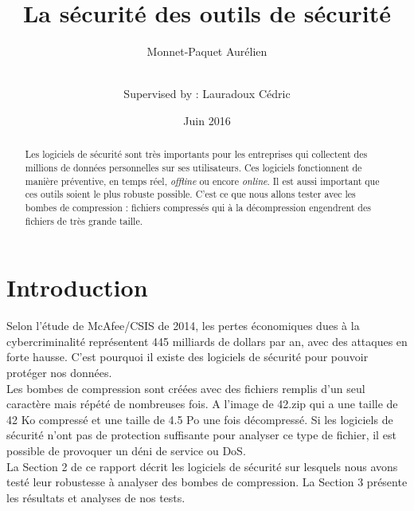 \documentclass{svjour3}
\begin{document}
\title{La sécurité des outils de sécurité}


\author{Monnet-Paquet Aurélien  \\ \and \\
        Supervised by : Lauradoux Cédric
}



\date{Juin 2016}


\maketitle

\begin{abstract}
Les logiciels de sécurité sont très importants pour les entreprises qui collectent des millions de données personnelles sur ses utilisateurs. Ces logiciels fonctionnent de manière préventive, en temps réel, \textit{offline} ou encore \textit{online}. Il est aussi important que ces outils soient le plus robuste possible. C'est ce que nous allons tester avec les bombes de compression : fichiers compressés qui à la décompression engendrent des fichiers de très grande taille.

\end{abstract}

\section{Introduction}
\label{intro}
Selon l'étude de McAfee/CSIS de 2014, les pertes économiques dues à la cybercriminalité représentent 445 milliards de dollars par an, avec des attaques en forte hausse. C'est pourquoi il existe des logiciels de sécurité pour pouvoir protéger nos données.\\
Les bombes de compression sont créées avec des fichiers remplis d'un seul caractère mais répété de nombreuses fois. A l'image de 42.zip qui a une taille de 42 Ko compressé et une taille de 4.5 Po une fois décompressé. Si les logiciels de sécurité n'ont pas de protection suffisante pour analyser ce type de fichier, il est possible de provoquer un déni de service ou DoS.\\
La Section 2 de ce rapport décrit les logiciels de sécurité sur lesquels nous avons testé leur robustesse à analyser des bombes de compression. La Section 3 présente les résultats et analyses de nos tests.
\end{document}
